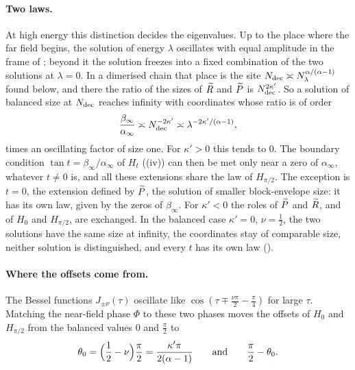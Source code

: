 \paragraph{Two laws.} At high energy this distinction decides the eigenvalues. Up to the
place where the far field begins, the solution of energy $\lambda$ oscillates with equal
amplitude in the frame of ; beyond it the solution freezes into a fixed
combination of the two solutions at $\lambda=0$. In a dimerised chain that place is the
site $N_{\rm dec}\asymp N_\lambda^{\alpha/(\alpha-1)}$ found below, and there the ratio of the
sizes of $\widetilde R$ and $\widetilde P$ is $N_{\rm dec}^{2\kappa'}$. So a solution of balanced size at
$N_{\rm dec}$ reaches infinity with coordinates whose ratio is of order
\[
  \frac{\beta_\infty}{\alpha_\infty}\asymp N_{\rm dec}^{-2\kappa'}\asymp\lambda^{-2\kappa'/(\alpha-1)},
\]
times an oscillating factor of size one. For $\kappa'>0$ this tends to $0$. The boundary
condition $\tan t=\beta_\infty/\alpha_\infty$ of $H_t$ ((iv)) can then be met
only near a zero of $\alpha_\infty$, whatever $t\ne0$ is, and all these extensions share the
law of $H_{\pi/2}$. The exception is $t=0$, the extension defined by $\widetilde P$, the solution of smaller
block-envelope size: it has its own law, given by the zeros of $\beta_\infty$. For $\kappa'<0$
the roles of $\widetilde P$ and $\widetilde R$, and of $H_0$ and $H_{\pi/2}$, are exchanged. In the balanced
case $\kappa'=0$, $\nu=\frac12$, the two solutions have the same size at infinity, the
coordinates stay of comparable size, neither solution is distinguished, and every $t$ has its
own law ().

\paragraph{Where the offsets come from.} The Bessel functions $J_{\pm\nu}(\tau)$ oscillate
like $\cos(\tau\mp\frac{\nu\pi}2-\frac\pi4)$ for large $\tau$. Matching the near-field phase
$\Phi$ to these two phases moves the offsets of $H_0$ and $H_{\pi/2}$ from the balanced values
$0$ and $\frac\pi2$ to
\[
  \theta_0=\Bigl(\frac12-\nu\Bigr)\frac\pi2=\frac{\kappa'\pi}{2(\alpha-1)}\qquad\text{and}\qquad
  \frac\pi2-\theta_0 .
\]

